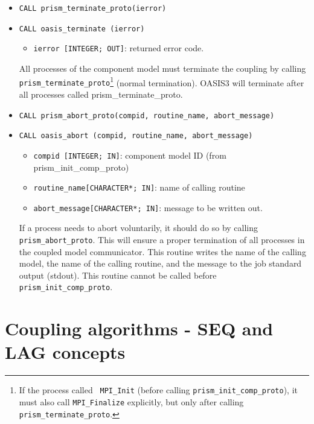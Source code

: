 \begin{itemize}

\item {\tt CALL prism\_terminate\_proto(ierror)}
\item {\tt CALL oasis\_terminate       (ierror)}
  \begin{itemize}
  \item {\tt ierror [INTEGER; OUT]}: returned error code.
  \end{itemize}
  All processes of the component model must terminate the coupling by calling {\tt
  prism\_terminate\_proto}\footnote{If the process called {\tt
  MPI\_Init} (before calling {\tt prism\_init\_comp\_proto}), it must
  also call {\tt MPI\_Finalize} explicitly, but only after calling
  {\tt prism\_terminate\_proto}.} (normal termination). OASIS3 will
  terminate after all processes called
  prism\_terminate\_proto.

\item {\tt CALL prism\_abort\_proto(compid, routine\_name, abort\_message)}
\item {\tt CALL oasis\_abort       (compid, routine\_name, abort\_message)}
\begin{itemize}
  \item {\tt compid [INTEGER; IN]}: component model ID (from
prism\_init\_comp\_proto) 
  \item {\tt routine\_name[CHARACTER*; IN]}: name of calling routine
  \item {\tt abort\_message[CHARACTER*; IN]}: message to be written out.
\end{itemize}

 If a process needs to abort voluntarily, it should do so by
 calling {\tt prism\_abort\_proto}. This will ensure a proper
 termination of all processes in the coupled model communicator. This
 routine writes the name of the calling model, the name of the
 calling routine, and the message to the job standard output (stdout). 
 This routine cannot be called before {\tt prism\_init\_comp\_proto}.

\end{itemize}


\section{Coupling algorithms - SEQ and LAG concepts}
\label{subsubsec_Algoritms}

